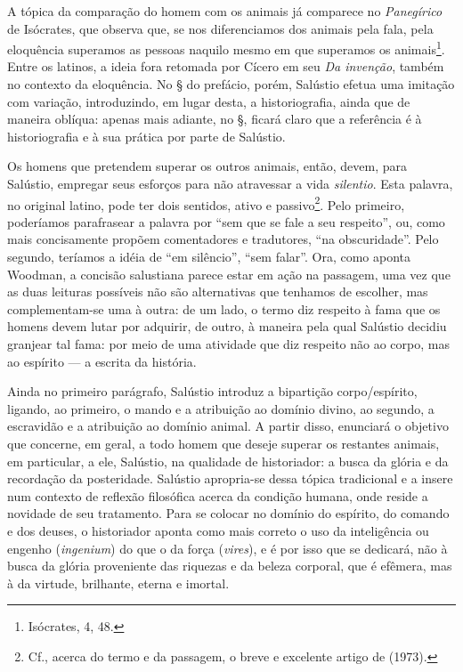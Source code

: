 A tópica da comparação do homem com os animais já comparece no
\emph{Panegírico} de Isócrates, que observa que, se nos diferenciamos dos
animais pela fala, pela eloquência superamos as pessoas naquilo mesmo em que
superamos os animais\footnote{Isócrates, 4, 48.}. Entre os
latinos, a ideia fora retomada por Cícero em seu \emph{Da invenção}, também no
contexto da eloquência. No § do prefácio, porém, Salústio efetua uma imitação
com variação, introduzindo, em lugar desta, a historiografia, ainda que de
maneira oblíqua: apenas mais adiante, no §, ficará claro que a referência é à
historiografia e à sua prática por parte de Salústio. 

Os homens que pretendem superar os outros animais, então, devem, para Salústio,
empregar seus esforços para não atravessar a vida \emph{silentio}. Esta
palavra, no original latino, pode ter dois sentidos, ativo e
passivo\footnote{Cf., acerca do termo e da passagem, o breve e excelente artigo
de  (1973).}. Pelo primeiro, poderíamos parafrasear a palavra por “sem
que se fale a seu respeito”, ou, como mais concisamente propõem comentadores e
tradutores, “na obscuridade”. Pelo segundo, teríamos a idéia de “em silêncio”,
“sem falar”. Ora, como aponta Woodman, a concisão salustiana parece estar em ação na passagem, uma vez que as duas leituras possíveis não são
alternativas que tenhamos de escolher, mas complementam-se uma à outra: de um
lado, o termo diz respeito à fama que os homens devem lutar por adquirir, de
outro, à maneira pela qual Salústio decidiu granjear tal fama: por meio de uma
atividade que diz respeito não ao corpo, mas ao espírito --- a escrita da
história.

Ainda no primeiro parágrafo, Salústio introduz a bipartição corpo/espírito,
ligando, ao primeiro, o mando e a atribuição ao domínio divino, ao segundo, a
escravidão e a atribuição ao domínio animal. A partir disso, enunciará o
objetivo que concerne, em geral, a todo homem que deseje superar os restantes
animais, em particular, a ele, Salústio, na qualidade de historiador: a busca
da glória e da recordação da posteridade. Salústio apropria-se dessa tópica
tradicional
 e a insere num contexto de reflexão filosófica acerca da condição humana, onde
 reside a novidade de seu tratamento. Para se colocar no domínio do espírito,
 do comando e dos deuses, o historiador aponta como mais correto o uso da
 inteligência ou engenho (\emph{ingenium}) do que o da força (\emph{vires}), e
 é por isso que se dedicará, não à busca da glória proveniente das riquezas e
 da beleza corporal, que é efêmera, mas à da virtude, brilhante, eterna e
 imortal.

